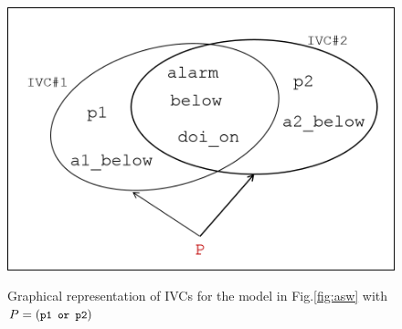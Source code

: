 \begin{figure}[t]
 \centering
  \includegraphics[width=0.65\columnwidth]{figs/ivcs.png}
  \label{fig:ivcs}
  \vspace{-0.1in}
  \caption{Graphical representation of IVCs for the model in Fig.\ref{fig:asw} with  $P = (\small{\texttt{p1 or p2}})$}
\end{figure}




